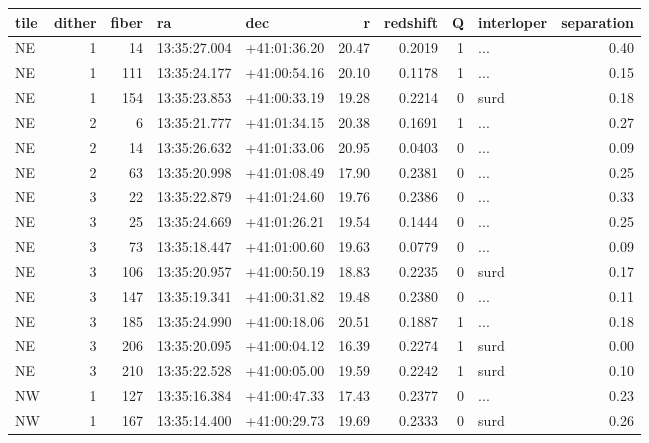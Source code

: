 \begin{tabular}{lrrllrrrlr}
\toprule
tile &  dither &  fiber &            ra &           dec &      r &  redshift &  Q & interloper &  separation \\
\midrule
  NE &       1 &     14 &  13:35:27.004 &  +41:01:36.20 &  20.47 &    0.2019 &  1 &        ... &        0.40 \\
  NE &       1 &    111 &  13:35:24.177 &  +41:00:54.16 &  20.10 &    0.1178 &  1 &        ... &        0.15 \\
  NE &       1 &    154 &  13:35:23.853 &  +41:00:33.19 &  19.28 &    0.2214 &  0 &       surd &        0.18 \\
  NE &       2 &      6 &  13:35:21.777 &  +41:01:34.15 &  20.38 &    0.1691 &  1 &        ... &        0.27 \\
  NE &       2 &     14 &  13:35:26.632 &  +41:01:33.06 &  20.95 &    0.0403 &  0 &        ... &        0.09 \\
  NE &       2 &     63 &  13:35:20.998 &  +41:01:08.49 &  17.90 &    0.2381 &  0 &        ... &        0.25 \\
  NE &       3 &     22 &  13:35:22.879 &  +41:01:24.60 &  19.76 &    0.2386 &  0 &        ... &        0.33 \\
  NE &       3 &     25 &  13:35:24.669 &  +41:01:26.21 &  19.54 &    0.1444 &  0 &        ... &        0.25 \\
  NE &       3 &     73 &  13:35:18.447 &  +41:01:00.60 &  19.63 &    0.0779 &  0 &        ... &        0.09 \\
  NE &       3 &    106 &  13:35:20.957 &  +41:00:50.19 &  18.83 &    0.2235 &  0 &       surd &        0.17 \\
  NE &       3 &    147 &  13:35:19.341 &  +41:00:31.82 &  19.48 &    0.2380 &  0 &        ... &        0.11 \\
  NE &       3 &    185 &  13:35:24.990 &  +41:00:18.06 &  20.51 &    0.1887 &  1 &        ... &        0.18 \\
  NE &       3 &    206 &  13:35:20.095 &  +41:00:04.12 &  16.39 &    0.2274 &  1 &       surd &        0.00 \\
  NE &       3 &    210 &  13:35:22.528 &  +41:00:05.00 &  19.59 &    0.2242 &  1 &       surd &        0.10 \\
  NW &       1 &    127 &  13:35:16.384 &  +41:00:47.33 &  17.43 &    0.2377 &  0 &        ... &        0.23 \\
  NW &       1 &    167 &  13:35:14.400 &  +41:00:29.73 &  19.69 &    0.2333 &  0 &       surd &        0.26 \\

\end{tabular}
